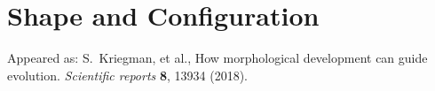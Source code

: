 

\chapter{Shape and Configuration}

{\footnotesize
\noindent
Appeared as:
S.~Kriegman, et al., How morphological development can guide evolution. \textit{Scientific reports} \textbf{8}, 13934 (2018).
}

\vspace{2em}





% 

% 

% 

% 


% 


% 